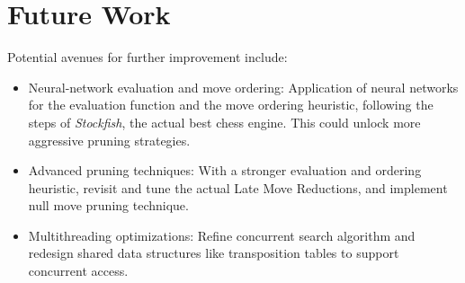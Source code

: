 \section{Future Work}

\noindent Potential avenues for further improvement include:

\begin{itemize}[itemsep=1pt]
    \item Neural-network evaluation and move ordering:  
    Application of neural networks for the evaluation function and the move ordering heuristic, following the steps of \textit{Stockfish}, the actual best chess engine. This could unlock more aggressive pruning strategies.
    \item Advanced pruning techniques:  
    With a stronger evaluation and ordering heuristic, revisit and tune the actual Late Move Reductions, and implement null move pruning technique.
    \item Multithreading optimizations:  
    Refine concurrent search algorithm and redesign shared data structures like transposition tables to support concurrent access.
\end{itemize}
